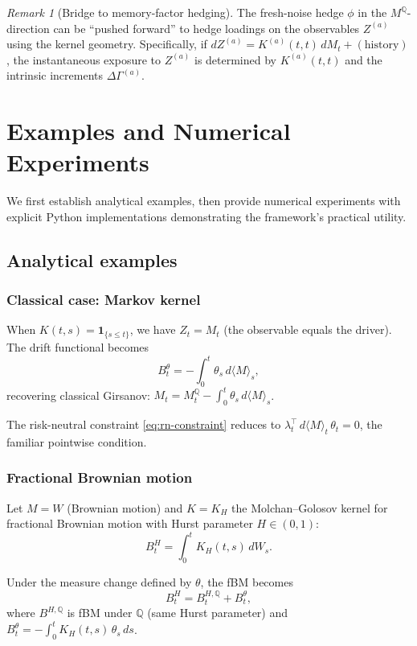 \documentclass[11pt]{article}
\theoremstyle{plain}
\theoremstyle{definition}
\theoremstyle{remark}
\newtheorem{remark}{Remark}[section]
\newcommand{\QQ}{\mathbb{Q}}
\newcommand{\dGamma}{\Delta\Gamma}
\newcommand{\bracket}[1]{\langle #1 \rangle}
\begin{document}
\begin{remark}[Bridge to memory-factor hedging]
The fresh-noise hedge $\phi$ in the $M^{\QQ}$-direction can be ``pushed forward''
to hedge loadings on the observables $Z^{(a)}$ using the kernel geometry.
Specifically, if $dZ^{(a)} = K^{(a)}(t,t)\,dM_t + (\text{history})$, the
instantaneous exposure to $Z^{(a)}$ is determined by $K^{(a)}(t,t)$ and
the intrinsic increments $\dGamma^{(a)}$.
\end{remark}

\section{Examples and Numerical Experiments}\label{sec:examples}

We first establish analytical examples, then provide numerical experiments
with explicit Python implementations demonstrating the framework's practical
utility.

\subsection{Analytical examples}

\subsubsection{Classical case: Markov kernel}

When $K(t,s) = \mathbf{1}_{\{s \le t\}}$, we have $Z_t = M_t$ (the observable
equals the driver). The drift functional becomes
\[
B_t^\theta = -\int_0^t \theta_s\,d\bracket{M}_s,
\]
recovering classical Girsanov: $M_t = M_t^{\QQ} - \int_0^t \theta_s\,d\bracket{M}_s$.

The risk-neutral constraint \eqref{eq:rn-constraint} reduces to
$\lambda_t^\top\,d\bracket{M}_t\,\theta_t = 0$, the familiar pointwise condition.

\subsubsection{Fractional Brownian motion}

Let $M = W$ (Brownian motion) and $K = K_H$ the Molchan--Golosov kernel for
fractional Brownian motion with Hurst parameter $H \in (0,1)$:
\[
B_t^H = \int_0^t K_H(t,s)\,dW_s.
\]

Under the measure change defined by $\theta$, the fBM becomes
\[
B_t^H = B_t^{H,\QQ} + B_t^\theta,
\]
where $B^{H,\QQ}$ is fBM under $\QQ$ (same Hurst parameter) and
$B_t^\theta = -\int_0^t K_H(t,s)\,\theta_s\,ds$.
\end{document}
